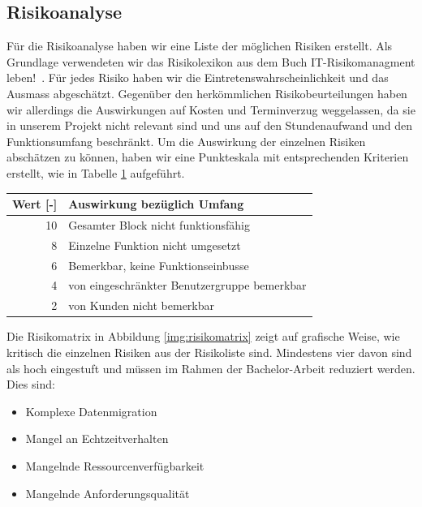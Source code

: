\subsection{Risikoanalyse}
Für die Risikoanalyse haben wir eine Liste der möglichen  Risiken erstellt. Als Grundlage verwendeten wir das Risikolexikon aus dem Buch \flqq IT-Risikomanagment leben!\frqq ~\cite{AhrendtsFabian2008Il:w}. 
Für jedes Risiko haben wir die Eintretenswahrscheinlichkeit und das Ausmass abgeschätzt. Gegenüber den herkömmlichen Risikobeurteilungen haben wir allerdings die Auswirkungen auf Kosten und Terminverzug weggelassen, da sie in unserem Projekt nicht relevant sind und uns auf den Stundenaufwand und den Funktionsumfang beschränkt. Um die Auswirkung der einzelnen Risiken abschätzen zu können, haben wir eine Punkteskala mit entsprechenden Kriterien erstellt, wie in Tabelle \ref{tab:auswirkung} aufgeführt. \vspace{5mm} %

\begin{table}[h!]
\centering
\label{tab:auswirkung}
\begin{tabular}{rl}
Wert	[-]	& 	Auswirkung bezüglich Umfang \\
\hline
10	&	Gesamter Block nicht funktionsfähig \\
8	&	Einzelne Funktion nicht umgesetzt  \\
6	&	Bemerkbar, keine Funktionseinbusse \\
4	&	von eingeschränkter Benutzergruppe bemerkbar \\
2	&	von Kunden nicht bemerkbar
\end{tabular}
\end{table}

Die Risikomatrix in Abbildung \ref{img:risikomatrix} zeigt auf grafische Weise, wie kritisch die einzelnen Risiken aus der Risikoliste sind. Mindestens vier davon sind als hoch eingestuft und müssen im Rahmen der Bachelor-Arbeit reduziert werden. Dies sind:

\begin{itemize}  
\item Komplexe Datenmigration
\item Mangel an Echtzeitverhalten
\item Mangelnde Ressourcenverfügbarkeit
\item Mangelnde Anforderungsqualität
\end{itemize}


